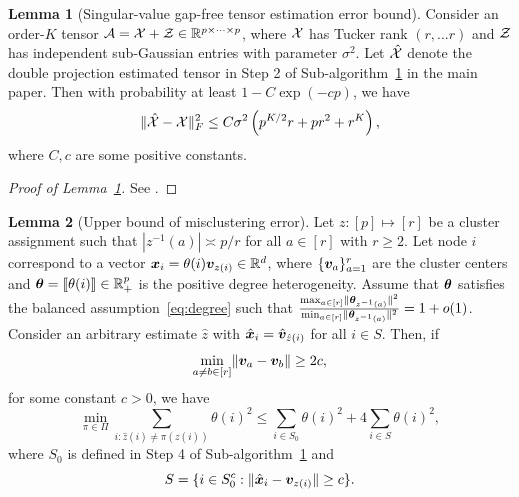 \documentclass[journal]{IEEEtran}
\theoremstyle{definition}
\newtheorem{lem}{Lemma}
\theoremstyle{definition}
\newcommand{\of}[1]{\left(#1\right)}
\begin{document}
\begin{lem}[Singular-value gap-free tensor estimation error bound]\label{lem:two-step_esterror}Consider an order-$K$ tensor $\mathcal{A} = \mathcal{X} + \mathcal{Z} \in \mathbb{R}^{p \times \cdots \times p}$, where $\mathcal{X}$ has Tucker rank $(r,...r)$ and $\mathcal{Z}$ has independent sub-Gaussian entries with parameter $\sigma^2$. Let $\hat {\mathcal{X}}$ denote the double projection estimated tensor in Step 2 of Sub-algorithm~\hyperref[alg:main]{1} in the main paper. Then with probability at least $1 - C \exp\of{- cp }$, we have
\begin{align}
    \onormSize{}{\hat \tX - \tX}_F^2 \leq C \sigma^2 \of{ p^{K/2}r + pr^2 + r^K },
\end{align}
where $C, c$ are some positive constants.
\end{lem}

\begin{proof}[Proof of Lemma~\ref{lem:two-step_esterror}]
See \cite[Proposition 1]{han2020exact}.
\end{proof}

\begin{lem}[Upper bound of misclustering error]\label{lem:upper_mis} Let $z: [p] \mapsto [r]$ be a cluster assignment such that $|z^{-1}(a)| \asymp p/r$ for all $a \in [r]$ {with $r \geq 2$}. Let node $i$ correspond to a vector $\bm x_i  = \theta(i) \bm{v}_{z(i)} \in \mathbb{R}^d$, where $\{\bm{v}_a\}_{a = 1}^r$ are the cluster centers and $\boldsymbol{\theta} = \llbracket \theta(i) \rrbracket \in \mathbb{R}^p_+$ is the positive degree heterogeneity.  Assume that  $\boldsymbol{\theta}$ satisfies the balanced assumption~\eqref{eq:degree} such that ${\max_{a \in [r]} \lVert\boldsymbol{\theta}_{z^{-1}(a)}\rVert^2 \over \min_{a \in [r]} \lVert\boldsymbol{\theta}_{z^{-1}(a)}\rVert^2 }= 1 + o(1)$. Consider an arbitrary estimate $\hat z$ with $\hat {\bm x}_i = \hat {\bm{v}}_{\hat z(i)}$ for all $ i \in S$. Then, if
\begin{equation}\label{eq:upper_mis_cond}
    \min_{a \neq b \in [r]} \onormSize{}{\mv_a - \mv_b} \geq 2c,
\end{equation}
 for some constant $c >0$, we have 
\begin{equation}
    \min_{\pi \in \Pi} \sum_{i : \hat z(i) \neq \pi(z(i))} \theta(i)^2 \leq \sum_{i \in S_0} \theta(i)^2 + 4 \sum_{i \in S} \theta(i)^2,
\end{equation}
where $S_0$ is defined in {Step 4} of Sub-algorithm~\hyperref[alg:main]{1} and
\begin{equation}
   S = \{i \in S_0^c: \lVert\hat {\bm x}_i - \bm{v}_{z(i)} \rVert \geq c \}.
\end{equation}

\end{lem}
\end{document}
